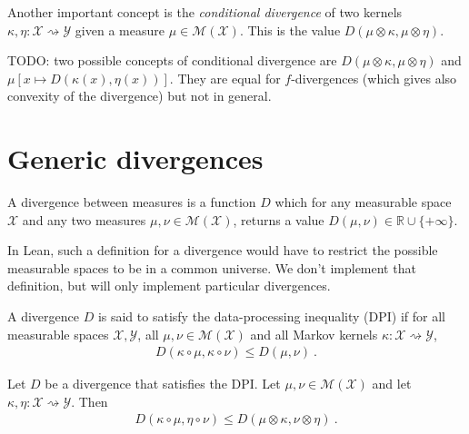 Another important concept is the \emph{conditional divergence} of two kernels $\kappa, \eta : \mathcal X \rightsquigarrow \mathcal Y$ given a measure $\mu \in \mathcal M(\mathcal X)$. This is the value $D(\mu \otimes \kappa, \mu \otimes \eta)$.

TODO: two possible concepts of conditional divergence are $D(\mu \otimes \kappa, \mu \otimes \eta)$ and $\mu\left[x \mapsto D(\kappa(x), \eta(x))\right]$. They are equal for $f$-divergences (which gives also convexity of the divergence) but not in general. 

\section{Generic divergences}

\begin{definition}[Divergence]
  \label{def:div}
  \uses{}
  A divergence between measures is a function $D$ which for any measurable space $\mathcal X$ and any two measures $\mu, \nu \in \mathcal M(\mathcal X)$, returns a value $D(\mu, \nu) \in \mathbb{R} \cup \{+\infty\}$.
\end{definition}


\begin{leanremark}
In Lean, such a definition for a divergence would have to restrict the possible measurable spaces to be in a common universe.
We don't implement that definition, but will only implement particular divergences.
\end{leanremark}


\begin{definition}
  \label{def:dpi}
  A divergence $D$ is said to satisfy the data-processing inequality (DPI) if for all measurable spaces $\mathcal X, \mathcal Y$, all $\mu, \nu \in \mathcal M(\mathcal X)$ and all Markov kernels $\kappa : \mathcal X \rightsquigarrow \mathcal Y$,
  \begin{align*}
  D(\kappa \circ \mu, \kappa \circ \nu) \le D(\mu, \nu) \: .
  \end{align*}
\end{definition}


\begin{lemma}
  \label{lem:div_comp_le_div_compProd}
  Let $D$ be a divergence that satisfies the DPI. Let $\mathcal \mu, \nu \in \mathcal M(\mathcal X)$ and let $\kappa, \eta : \mathcal X \rightsquigarrow \mathcal Y$. Then
  \begin{align*}
  D(\kappa \circ \mu, \eta \circ \nu) \le D(\mu \otimes \kappa, \nu \otimes \eta) \: .
  \end{align*}
\end{lemma}

